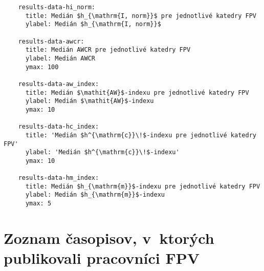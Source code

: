 \begin{source}
\begin{verbatim}
    results-data-hi_norm:
      title: Medián $h_{\mathrm{I, norm}}$ pre jednotlivé katedry FPV
      ylabel: Medián $h_{\mathrm{I, norm}}$

    results-data-awcr:
      title: Medián AWCR pre jednotlivé katedry FPV
      ylabel: Medián AWCR
      ymax: 100

    results-data-aw_index:
      title: Medián $\mathit{AW}$-indexu pre jednotlivé katedry FPV
      ylabel: Medián $\mathit{AW}$-indexu
      ymax: 10

    results-data-hc_index:
      title: 'Medián $h^{\mathrm{c}}\!$-indexu pre jednotlivé katedry FPV'
      ylabel: 'Medián $h^{\mathrm{c}}\!$-indexu'
      ymax: 10

    results-data-hm_index:
      title: Medián $h_{\mathrm{m}}$-indexu pre jednotlivé katedry FPV
      ylabel: Medián $h_{\mathrm{m}}$-indexu
      ymax: 5
  \end{verbatim}
\end{source}

\section*{Zoznam časopisov, v~ktorých publikovali pracovníci FPV}
\vspace{-0.5em}

